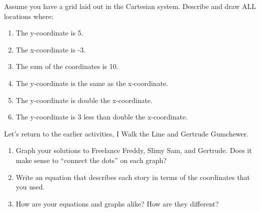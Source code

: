 \documentclass[nooutcomes] {ximera}
\begin{document}
\pagebreak

\begin{problem}
Assume you have a grid laid out in the Cartesian system.  Describe and draw ALL locations where:
\begin{enumerate}
\item The y-coordinate is 5.
\item The x-coordinate is -3.
\item The sum of the coordinates is 10.
\item The y-coordinate is the same as the x-coordinate.
\item The y-coordinate is double the x-coordinate.
\item The y-coordinate is 3 less than double the x-coordinate.
\end{enumerate}

\end{problem}


\begin{problem}
Let's return to the earlier activities, I Walk the Line and Gertrude Gumchewer.
    \begin{enumerate}
        \item Graph your solutions to Freelance Freddy, Slimy Sam, and Gertrude.  Does it make sense to ``connect the dots'' on each graph?
        \item Write an equation that describes each story in terms of the coordinates that you used.
        \item How are your equations and graphs alike? How are they different?
    \end{enumerate}    

\end{problem}
\end{document}
